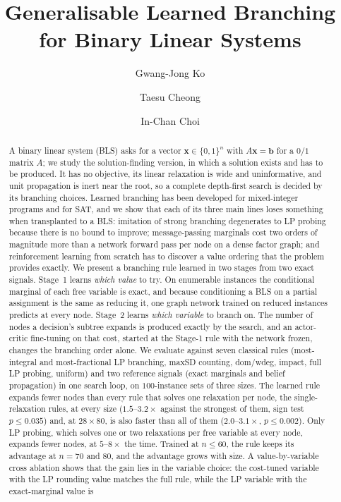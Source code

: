 \documentclass[final,5p,times,twocolumn,authoryear]{elsarticle}
\begin{document}
\begin{frontmatter}

\title{Generalisable Learned Branching for Binary Linear Systems}

\author[ku]{Gwang-Jong Ko}
\author[ku]{Taesu Cheong}
\author[ku]{In-Chan Choi}

\begin{abstract}
A binary linear system (BLS) asks for a vector $\mathbf{x}\in\{0,1\}^n$ with $A\mathbf{x}=\mathbf{b}$ for a $0/1$ matrix $A$; we study the solution-finding version, in which a solution exists and has to be produced. It has no objective, its linear relaxation is wide and uninformative, and unit propagation is inert near the root, so a complete depth-first search is decided by its branching choices. Learned branching has been developed for mixed-integer programs and for SAT, and we show that each of its three main lines loses something when transplanted to a BLS: imitation of strong branching degenerates to LP probing because there is no bound to improve; message-passing marginals cost two orders of magnitude more than a network forward pass per node on a dense factor graph; and reinforcement learning from scratch has to discover a value ordering that the problem provides exactly. We present a branching rule learned in two stages from two exact signals. Stage~1 learns \emph{which value} to try. On enumerable instances the conditional marginal of each free variable is exact, and because conditioning a BLS on a partial assignment is the same as reducing it, one graph network trained on reduced instances predicts at every node. Stage~2 learns \emph{which variable} to branch on. The number of nodes a decision's subtree expands is produced exactly by the search, and an actor-critic fine-tuning on that cost, started at the Stage-1 rule with the network frozen, changes the branching order alone. We evaluate against seven classical rules (most-integral and most-fractional LP branching, maxSD counting, dom/wdeg, impact, full LP probing, uniform) and two reference signals (exact marginals and belief propagation) in one search loop, on $100$-instance sets of three sizes. The learned rule expands fewer nodes than every rule that solves one relaxation per node, the single-relaxation rules, at every size ($1.5$--$3.2\times$ against the strongest of them, sign test $p\le0.035$) and, at $28\times80$, is also faster than all of them ($2.0$--$3.1\times$, $p\le0.002$). Only LP probing, which solves one or two relaxations per free variable at every node, expands fewer nodes, at $5$--$8\times$ the time. Trained at $n\le60$, the rule keeps its advantage at $n=70$ and $80$, and the advantage grows with size. A value-by-variable cross ablation shows that the gain lies in the variable choice: the cost-tuned variable with the LP rounding value matches the full rule, while the LP variable with the exact-marginal value is 
\end{abstract}
\end{frontmatter}
\end{document}
